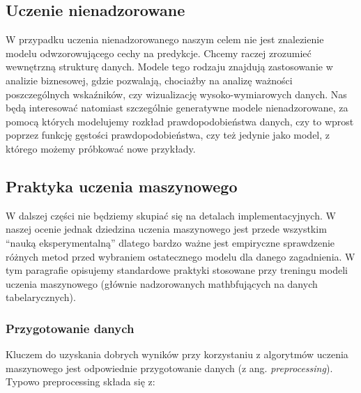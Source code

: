 \documentclass{myclass}
\numberwithin{equation}{section}
\begin{document}
\subsection{Uczenie nienadzorowane}

W przypadku uczenia nienadzorowanego naszym celem nie jest znalezienie modelu odwzorowującego cechy
na predykcje. Chcemy raczej zrozumieć wewnętrzną strukturę danych. Modele tego rodzaju znajdują
zastosowanie w analizie biznesowej, gdzie pozwalają, chociażby na analizę ważności poszczególnych
wskaźników, czy wizualizację wysoko-wymiarowych danych. Nas będą interesować natomiast szczególnie
generatywne modele nienadzorowane, za pomocą których modelujemy rozkład prawdopodobieństwa danych,
czy to wprost poprzez funkcję gęstości prawdopodobieństwa, czy też jedynie jako model, z którego
możemy próbkować nowe przykłady.


\subsection{Praktyka uczenia maszynowego}

W dalszej części nie będziemy skupiać się na detalach implementacyjnych. W naszej ocenie jednak
dziedzina uczenia maszynowego jest przede wszystkim \enquote{nauką eksperymentalną} dlatego bardzo
ważne jest empiryczne sprawdzenie różnych metod przed wybraniem ostatecznego modelu dla danego
zagadnienia. W tym paragrafie opisujemy standardowe praktyki stosowane przy treningu modeli uczenia
maszynowego (głównie nadzorowanych mathbfujących na danych tabelarycznych).


\subsubsection{Przygotowanie danych}

Kluczem do uzyskania dobrych wyników przy korzystaniu z algorytmów uczenia maszynowego jest
odpowiednie przygotowanie danych (z ang. \textit{preprocessing}). Typowo preprocessing składa się z:
\end{document}
